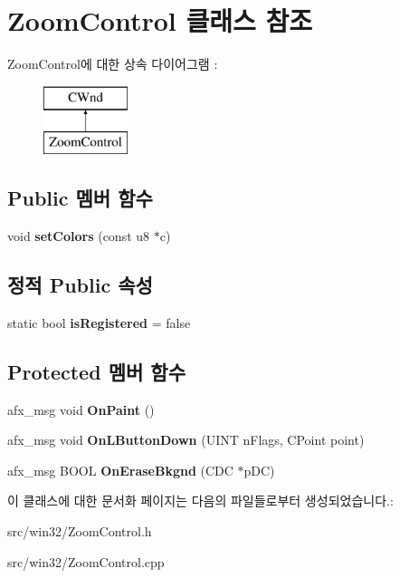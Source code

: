 \hypertarget{class_zoom_control}{}\section{Zoom\+Control 클래스 참조}
\label{class_zoom_control}
Zoom\+Control에 대한 상속 다이어그램 \+: \begin{figure}[H]
\begin{center}
\leavevmode
\includegraphics[height=2.000000cm]{class_zoom_control}
\end{center}
\end{figure}
\subsection*{Public 멤버 함수}
\begin{DoxyCompactItemize}
\item 
\mbox{\label{class_zoom_control_a97501cc16d3068eefa1b5d9d23e9d0d9}} 
void {\bfseries set\+Colors} (const u8 $\ast$c)
\end{DoxyCompactItemize}
\subsection*{정적 Public 속성}
\begin{DoxyCompactItemize}
\item 
\mbox{\label{class_zoom_control_a545871645485be870723f47d8ef439ff}} 
static bool {\bfseries is\+Registered} = false
\end{DoxyCompactItemize}
\subsection*{Protected 멤버 함수}
\begin{DoxyCompactItemize}
\item 
\mbox{\label{class_zoom_control_a76dc63877ee99097aa9b0aa86a408419}} 
afx\+\_\+msg void {\bfseries On\+Paint} ()
\item 
\mbox{\label{class_zoom_control_a350939fc193e3fd5dbc1f3e6cb18b4c0}} 
afx\+\_\+msg void {\bfseries On\+L\+Button\+Down} (U\+I\+NT n\+Flags, C\+Point point)
\item 
\mbox{\label{class_zoom_control_a9efd77599efc02d9059a797b59a7911f}} 
afx\+\_\+msg B\+O\+OL {\bfseries On\+Erase\+Bkgnd} (C\+DC $\ast$p\+DC)
\end{DoxyCompactItemize}


이 클래스에 대한 문서화 페이지는 다음의 파일들로부터 생성되었습니다.\+:\begin{DoxyCompactItemize}
\item 
src/win32/Zoom\+Control.\+h\item 
src/win32/Zoom\+Control.\+cpp\end{DoxyCompactItemize}
